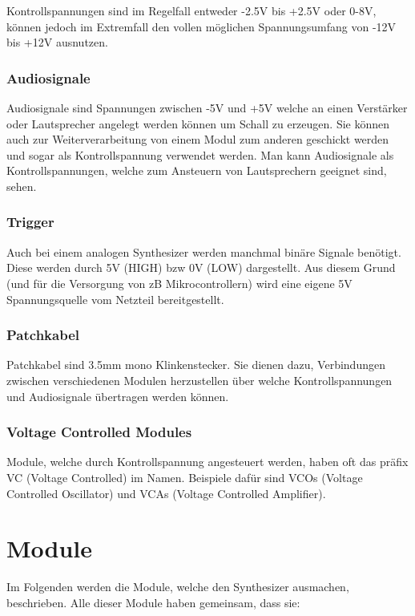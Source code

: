 Kontrollspannungen sind im Regelfall entweder -2.5V bis +2.5V oder 0-8V, können jedoch im Extremfall den vollen möglichen Spannungsumfang von -12V bis +12V ausnutzen.

\subsubsection{Audiosignale}
\label{sec:orgd63de81}
Audiosignale sind Spannungen zwischen -5V und +5V welche an einen Verstärker oder Lautsprecher angelegt werden können um Schall zu erzeugen. Sie können auch zur Weiterverarbeitung von einem Modul zum anderen geschickt werden und sogar als Kontrollspannung verwendet werden. Man kann Audiosignale als Kontrollspannungen, welche zum Ansteuern von Lautsprechern geeignet sind, sehen.

\subsubsection{Trigger}
\label{sec:org73c00e3}
Auch bei einem analogen Synthesizer werden manchmal binäre Signale benötigt. Diese werden durch 5V (HIGH) bzw 0V (LOW) dargestellt. Aus diesem Grund (und für die Versorgung von zB Mikrocontrollern) wird eine eigene 5V Spannungsquelle vom Netzteil bereitgestellt.

\subsubsection{Patchkabel}
\label{sec:org991890f}
Patchkabel sind 3.5mm mono Klinkenstecker. Sie dienen dazu, Verbindungen zwischen verschiedenen Modulen herzustellen über welche Kontrollspannungen und Audiosignale übertragen werden können.

\subsubsection{Voltage Controlled Modules}
\label{sec:org0ea57e6}
Module, welche durch Kontrollspannung angesteuert werden, haben oft das präfix VC (Voltage Controlled) im Namen. Beispiele dafür sind VCOs (Voltage Controlled Oscillator) und VCAs (Voltage Controlled Amplifier).

\section{Module}
\label{sec:org480f352}

Im Folgenden werden die Module, welche den Synthesizer ausmachen, beschrieben. Alle dieser Module haben gemeinsam, dass sie:

